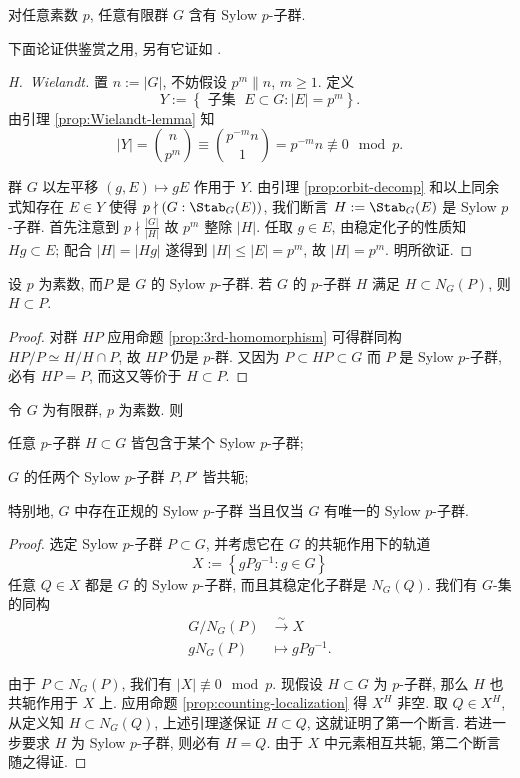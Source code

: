 \begin{theorem}
	对任意素数 $p$, 任意有限群 $G$ 含有 Sylow $p$-子群.
\end{theorem}
下面论证供鉴赏之用, 另有它证如 \cite[Theorem 6.2]{Lang02}.
\begin{proof}[H.\ Wielandt]
	置 $n := |G|$, 不妨假设 $p^m \| n$, $m \geq 1$. 定义
	\[ Y := \left\{ \text{ 子集 } \; E \subset G : |E|=p^m \right\}. \]
	由引理 \ref{prop:Wielandt-lemma} 知
	\[ |Y| = \binom{n}{p^m} \equiv \binom{p^{-m} n}{1} = p^{-m} n \not\equiv 0 \mod p . \]

	群 $G$ 以左平移 $(g, E) \mapsto gE$ 作用于 $Y$. 由引理 \ref{prop:orbit-decomp} 和以上同余式知存在 $E \in Y$ 使得 $p \nmid (G: \Stab_G(E))$, 我们断言 $H := \Stab_G(E)$ 是 Sylow $p$-子群. 首先注意到 $p \nmid \frac{|G|}{|H|}$ 故 $p^m$ 整除 $|H|$. 任取 $g \in E$, 由稳定化子的性质知 $Hg  \subset E$; 配合 $|H|=|Hg|$ 遂得到 $|H| \leq  |E| = p^m$, 故 $|H|=p^m$. 明所欲证.
\end{proof}

\begin{lemma}
	设 $p$ 为素数, 而$P$ 是 $G$ 的 Sylow $p$-子群. 若 $G$ 的 $p$-子群 $H$ 满足 $H \subset N_G(P)$, 则 $H \subset P$.
\end{lemma}
\begin{proof}
	对群 $HP$ 应用命题 \ref{prop:3rd-homomorphism} 可得群同构 $HP/P \simeq H/H \cap P$, 故 $HP$ 仍是 $p$-群. 又因为 $P \subset HP \subset G$ 而 $P$ 是 Sylow $p$-子群, 必有 $HP=P$, 而这又等价于 $H \subset P$.
\end{proof}

\begin{theorem}
	令 $G$ 为有限群, $p$ 为素数. 则
	\begin{compactenum}[(i)]
		\item 任意 $p$-子群 $H \subset G$ 皆包含于某个 Sylow $p$-子群;
		\item $G$ 的任两个 Sylow $p$-子群 $P, P'$ 皆共轭;
	\end{compactenum}
	特别地, $G$ 中存在正规的 Sylow $p$-子群 当且仅当 $G$ 有唯一的 Sylow $p$-子群.
\end{theorem}
\begin{proof}
	选定 Sylow $p$-子群 $P \subset G$, 并考虑它在 $G$ 的共轭作用下的轨道
	\[ X := \left\{ gPg^{-1} : g \in G \right\} \]
	任意 $Q \in X$ 都是 $G$ 的 Sylow $p$-子群, 而且其稳定化子群是 $N_G(Q)$. 我们有 $G$-集的同构
	\begin{align*}
		G/N_G(P) & \stackrel{\sim}{\longrightarrow} X \\
		g N_G(P) & \longmapsto gPg^{-1}.
	\end{align*}

	由于 $P \subset N_G(P)$, 我们有 $|X| \not\equiv 0 \mod p$. 现假设 $H \subset G$ 为 $p$-子群, 那么 $H$ 也共轭作用于 $X$ 上. 应用命题 \ref{prop:counting-localization} 得 $X^H$ 非空. 取 $Q \in X^H$, 从定义知 $H \subset N_G(Q)$, 上述引理遂保证 $H \subset Q$, 这就证明了第一个断言. 若进一步要求 $H$ 为  Sylow $p$-子群, 则必有 $H = Q$. 由于 $X$ 中元素相互共轭, 第二个断言随之得证.
\end{proof}

